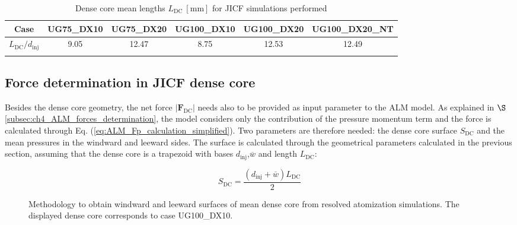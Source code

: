 \begin{table}[!h]
\centering
\caption{Dense core mean lengths $L_\mathrm{DC}~[\mathrm{mm}]$ for JICF simulations performed}
\begin{tabular}{cccccc}
\thickhline
\textbf{Case} &  UG75\_DX10 & UG75\_DX20 & UG100\_DX10 & UG100\_DX20 &  UG100\_DX20\_NT \\
\hline
$L_\mathrm{DC}/d_\mathrm{inj}$ & 9.05 & 12.47 & 8.75 & 12.53 & 12.49 \\
\thickhline
\end{tabular}
\label{tab:jicf_L_DC_values}
\end{table}






%

\subsection{Force determination in JICF dense core}

Besides the dense core geometry, the net force $|\textbf{F}_\mathrm{DC}|$ needs also to be provided as input parameter to the ALM model. As explained in $\S$\ref{subsec:ch4_ALM_forces_determination}, the model considers only the contribution of the pressure momentum term and the force is calculated through Eq. (\ref{eq:ALM_Fp_calculation_simplified}). Two parameters are therefore needed: the dense core surface $S_\mathrm{DC}$ and the mean pressures in the windward and leeward sides. The surface is calculated through the geometrical parameters calculated in the previous section, assuming that the dense core is a trapezoid with bases $d_\mathrm{inj}$,$\overline{w}$ and length $L_\mathrm{DC}$:

\begin{equation}
S_\mathrm{DC} = \frac{\left( d_\mathrm{inj} + \overline{w} \right) L_\mathrm{DC} }{2} 
\end{equation}

\begin{figure}[ht]
\flushleft
{}
\caption[Methodology to obtain windward and leeward surfaces of mean dense core from resolved atomization simulations]{Methodology to obtain windward and leeward surfaces of mean dense core from resolved atomization simulations. The displayed dense core corresponds to case UG100\_DX10.}
\label{fig:extraction_methodology_mean_DC}
\end{figure}

